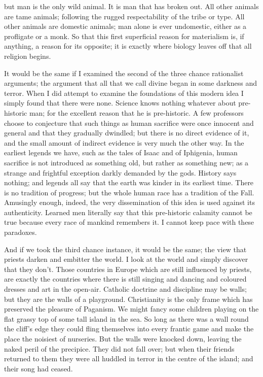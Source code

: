 but man is the only wild animal. It is man that has broken out. All other animals are tame animals; following the rugged respectability of the tribe or type. All other animals are domestic animals; man alone is ever undomestic, either as a profligate or a monk. So that this first superficial reason for materialism is, if anything, a reason for its opposite; it is exactly where biology leaves off that all religion begins.

It would be the same if I examined the second of the three chance rationalist arguments; the argument that all that we call divine began in some darkness and terror. When I did attempt to examine the foundations of this modern idea I simply found that there were none. Science knows nothing whatever about pre-historic man; for the excellent reason that he is pre-historic. A few professors choose to conjecture that such things as human sacrifice were once innocent and general and that they gradually dwindled; but there is no direct evidence of it, and the small amount of indirect evidence is very much the other way. In the earliest legends we have, such as the tales of Isaac and of Iphigenia, human sacrifice is not introduced as something old, but rather as something new; as a strange and frightful exception darkly demanded by the gods. History says nothing; and legends all say that the earth was kinder in its earliest time. There is no tradition of progress; but the whole human race has a tradition of the Fall. Amusingly enough, indeed, the very dissemination of this idea is used against its authenticity. Learned men literally say that this pre-historic calamity cannot be true because every race of mankind remembers it. I cannot keep pace with these paradoxes.

And if we took the third chance instance, it would be the same; the view that priests darken and embitter the world. I look at the world and simply discover that they don’t. Those countries in Europe which are still influenced by priests, are exactly the countries where there is still singing and dancing and coloured dresses and art in the open-air. Catholic doctrine and discipline may be walls; but they are the walls of a playground. Christianity is the only frame which has preserved the pleasure of Paganism. We might fancy some children playing on the flat grassy top of some tall island in the sea. So long as there was a wall round the cliff’s edge they could fling themselves into every frantic game and make the place the noisiest of nurseries. But the walls were knocked down, leaving the naked peril of the precipice. They did not fall over; but when their friends returned to them they were all huddled in terror in the centre of the island; and their song had ceased.

